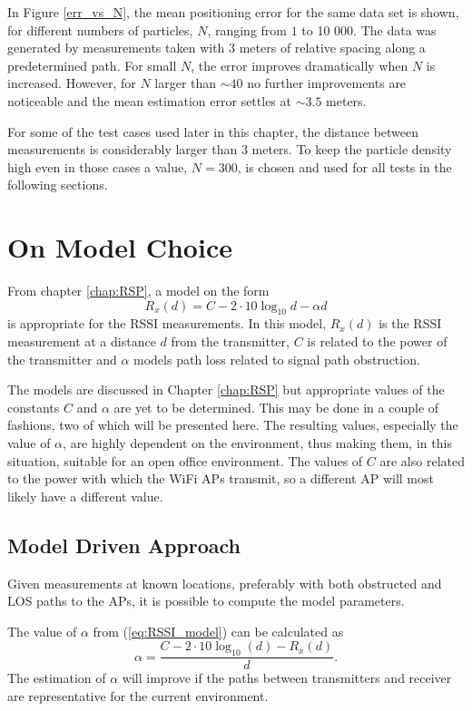 \documentclass{LTHthesis}
\begin{document}
In Figure \ref{err_vs_N}, the mean positioning error for the same data set is shown, for different numbers of particles, $N$, ranging from $1$ to 10 000. The data was generated by measurements taken with 3 meters of relative spacing along a predetermined path. For small $N$, the error improves dramatically when $N$ is increased. However, for $N$ larger than $\sim 40$ no further improvements are noticeable and the mean estimation error settles at $\sim 3.5$ meters. 

For some of the test cases used later in this chapter, the distance between measurements is considerably larger than 3 meters. To keep the particle density high even in those cases a value, $N=300$, is chosen and used for all tests in the following sections.    
%
\section{On Model Choice}
%
From chapter \ref{chap:RSP}, a model on the form
%
\begin{equation}
R_x(d) = C - 2\cdot10\log_{10}{d}-\alpha d
\label{eq:RSSI_model}
\end{equation}
%
is appropriate for the RSSI measurements. In this model, $R_x(d)$ is the RSSI measurement at a distance $d$ from the transmitter, $C$ is related to the power of the transmitter and $\alpha$ models path loss related to signal path obstruction. 

The models are discussed in Chapter \ref{chap:RSP} but appropriate values of the constants $C$ and $\alpha$ are yet to be determined. This may be done in a couple of fashions, two of which will be presented here. The resulting values, especially the value of $\alpha$, are highly dependent on the environment, thus making them, in this situation, suitable for an open office environment. The values of $C$ are also related to the power with which the WiFi APs transmit, so a different AP will most likely have a different value.      

\subsection{Model Driven Approach}
%
Given measurements at known locations, preferably with both obstructed and LOS paths to the APs, it is possible to compute the model parameters.

The value of $\alpha$ from (\ref{eq:RSSI_model}) can be calculated as
%
\begin{equation}
\alpha = \frac{C-2\cdot10\log_{10}(d)-R_x(d)}{d}.
\end{equation}
%
The estimation of $\alpha$ will improve if the paths between transmitters and receiver are representative for the current environment.  
\end{document}
